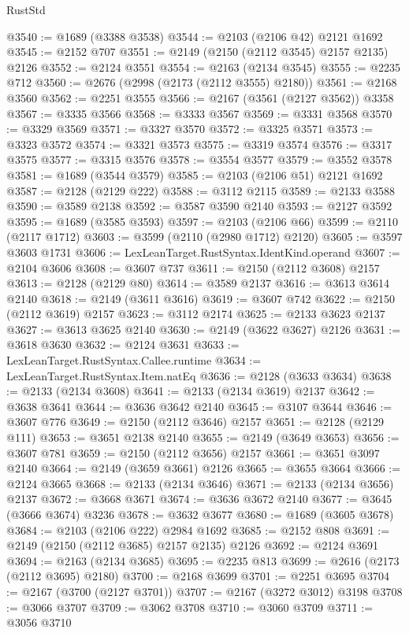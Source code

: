 \begin{lexlean}{RustStd}
\begin{coremodule}
@3540 := @1689 (@3388 @3538)
@3544 := @2103 (@2106 @42) @2121 @1692
@3545 := @2152 @707
@3551 := @2149 (@2150 (@2112 @3545) @2157 @2135) @2126
@3552 := @2124 @3551
@3554 := @2163 (@2134 @3545)
@3555 := @2235 @712
@3560 := @2676 (@2998 (@2173 (@2112 @3555) @2180))
@3561 := @2168 @3560
@3562 := @2251 @3555
@3566 := @2167 (@3561 (@2127 @3562)) @3358
@3567 := @3335 @3566
@3568 := @3333 @3567
@3569 := @3331 @3568
@3570 := @3329 @3569
@3571 := @3327 @3570
@3572 := @3325 @3571
@3573 := @3323 @3572
@3574 := @3321 @3573
@3575 := @3319 @3574
@3576 := @3317 @3575
@3577 := @3315 @3576
@3578 := @3554 @3577
@3579 := @3552 @3578
@3581 := @1689 (@3544 @3579)
@3585 := @2103 (@2106 @51) @2121 @1692
@3587 := @2128 (@2129 @222)
@3588 := @3112 @2115
@3589 := @2133 @3588
@3590 := @3589 @2138
@3592 := @3587 @3590 @2140
@3593 := @2127 @3592
@3595 := @1689 (@3585 @3593)
@3597 := @2103 (@2106 @66)
@3599 := @2110 (@2117 @1712)
@3603 := @3599 (@2110 (@2980 @1712) @2120)
@3605 := @3597 @3603 @1731
@3606 := LexLeanTarget.RustSyntax.IdentKind.operand
@3607 := @2104 @3606
@3608 := @3607 @737
@3611 := @2150 (@2112 @3608) @2157
@3613 := @2128 (@2129 @80)
@3614 := @3589 @2137
@3616 := @3613 @3614 @2140
@3618 := @2149 (@3611 @3616)
@3619 := @3607 @742
@3622 := @2150 (@2112 @3619) @2157
@3623 := @3112 @2174
@3625 := @2133 @3623 @2137
@3627 := @3613 @3625 @2140
@3630 := @2149 (@3622 @3627) @2126
@3631 := @3618 @3630
@3632 := @2124 @3631
@3633 := LexLeanTarget.RustSyntax.Callee.runtime
@3634 := LexLeanTarget.RustSyntax.Item.natEq
@3636 := @2128 (@3633 @3634)
@3638 := @2133 (@2134 @3608)
@3641 := @2133 (@2134 @3619) @2137
@3642 := @3638 @3641
@3644 := @3636 @3642 @2140
@3645 := @3107 @3644
@3646 := @3607 @776
@3649 := @2150 (@2112 @3646) @2157
@3651 := @2128 (@2129 @111)
@3653 := @3651 @2138 @2140
@3655 := @2149 (@3649 @3653)
@3656 := @3607 @781
@3659 := @2150 (@2112 @3656) @2157
@3661 := @3651 @3097 @2140
@3664 := @2149 (@3659 @3661) @2126
@3665 := @3655 @3664
@3666 := @2124 @3665
@3668 := @2133 (@2134 @3646)
@3671 := @2133 (@2134 @3656) @2137
@3672 := @3668 @3671
@3674 := @3636 @3672 @2140
@3677 := @3645 (@3666 @3674) @3236
@3678 := @3632 @3677
@3680 := @1689 (@3605 @3678)
@3684 := @2103 (@2106 @222) @2984 @1692
@3685 := @2152 @808
@3691 := @2149 (@2150 (@2112 @3685) @2157 @2135) @2126
@3692 := @2124 @3691
@3694 := @2163 (@2134 @3685)
@3695 := @2235 @813
@3699 := @2616 (@2173 (@2112 @3695) @2180)
@3700 := @2168 @3699
@3701 := @2251 @3695
@3704 := @2167 (@3700 (@2127 @3701))
@3707 := @2167 (@3272 @3012) @3198
@3708 := @3066 @3707
@3709 := @3062 @3708
@3710 := @3060 @3709
@3711 := @3056 @3710

\end{coremodule}
\end{lexlean}
